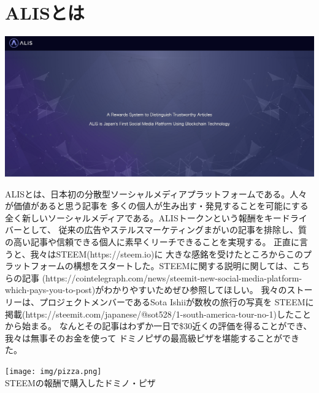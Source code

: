 \documentclass{jsarticle}
\begin{document}
\section{ALISとは}
\begin{center}
	\includegraphics[scale=0.25]{img/aliscover.png}
\end{center}
ALISとは、日本初の分散型ソーシャルメディアプラットフォームである。人々が価値があると思う記事を
多くの個人が生み出す・発見することを可能にする全く新しいソーシャルメディアである。ALISトークンという報酬をキードライバーとして、
従来の広告やステルスマーケティングまがいの記事を排除し、質の高い記事や信頼できる個人に素早くリーチできることを実現する。
正直に言うと、我々はSTEEM(https://steem.io)に
大きな感銘を受けたところからこのプラットフォームの構想をスタートした。STEEMに関する説明に関しては、こちらの記事
(https://cointelegraph.com/news/steemit-new-social-media-platform-which-pays-you-to-post)がわかりやすいためぜひ参照してほしい。
我々のストーリーは、プロジェクトメンバーであるSota Ishiiが数枚の旅行の写真を 
STEEMに掲載(https://steemit.com/japanese/@sot528/1-south-america-tour-no-1)したことから始まる。
なんとその記事はわずか一日で\$30近くの評価を得ることができ、我々は無事そのお金を使って
ドミノピザの最高級ピザを堪能することができた。

\begin{center}
	\texttt{[image: img/pizza.png]} \\
	STEEMの報酬で購入したドミノ・ピザ
\end{center}
\end{document}
